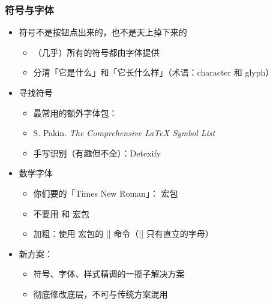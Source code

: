 \begin{frame}[fragile]
\frametitle{符号与字体}
\begin{itemize}
  \item 符号不是按钮点出来的，也不是天上掉下来的 \pause

    \begin{itemize}
      \item （几乎）所有的符号都由字体提供 \pause
      \item 分清「它是什么」和「它长什么样」（术语：character 和 glyph）
    \end{itemize} \pause

  \item 寻找符号

    \begin{itemize}
      \item 最常用的额外字体包：
      \item S. Pakin. \textit{The Comprehensive \LaTeX{} Symbol List}
      \item 手写识别（有趣但不全）：Detexify 
    \end{itemize} \pause

  \item 数学字体

    \begin{itemize}
      \item 你们要的「Times New Roman」： 宏包
      \item \alert{不要用  和  宏包}
      \item 加粗：使用  宏包的 |\bm| 命令（|\mathbf| 只有直立的字母）
    \end{itemize} \pause

  \item 新方案：

    \begin{itemize}
      \item 符号、字体、样式精调的一揽子解决方案
      \item 彻底修改底层，不可与传统方案混用
    \end{itemize}
\end{itemize}
\end{frame}

